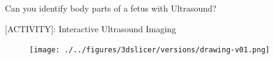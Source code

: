 



{
\begin{frame}{}

\BigSizeFont
\begin{center}
    Can you identify body parts of a fetus with Ultrasound?
\end{center}
\end{frame}
}

{


\begin{frame}{[\faUsers ACTIVITY]: Interactive Ultrasound Imaging }
      \begin{figure}
        \centering
        \texttt{[image: ./../figures/3dslicer/versions/drawing-v01.png]}
      \end{figure}
\end{frame}
}





